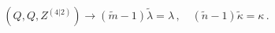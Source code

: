 \begin{equation}
(Q,Q,Z^{(4|2)}) \rightarrow (\tilde{m}-1) \tilde\lambda = \lambda\,,\quad
                            (\tilde{n}-1) \tilde\kappa  = \kappa\, .
\end{equation}

